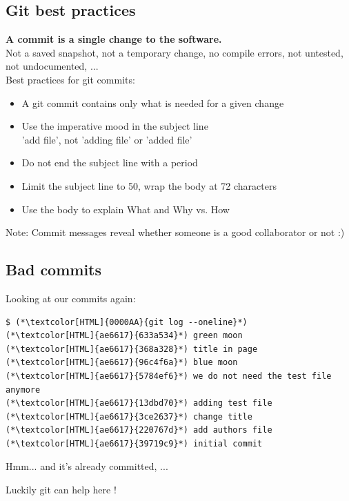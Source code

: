 \subsection{Git best practices}
\begin{frame}[fragile]
  \subslidetitle
  \textbf{A commit is a single change to the software.}\pause{} \\
  \vspace{1em}
  Not a saved snapshot,\pause{} not a temporary change,\pause{} no compile errors,\pause{} not
  untested,\pause{} not undocumented, ...\pause
  \\
  \vspace{1em}
  Best practices for git commits:
  \begin{itemize}
    \pause
    \item A git commit contains only what is needed for a given change
    \pause
    \item Use the imperative mood in the subject line \\
      'add file', not 'adding file' or 'added file'
    \pause
    \item Do not end the subject line with a period
    \pause
    \item Limit the subject line to 50, wrap the body at 72 characters
    \pause
    \item Use the body to explain What and Why vs. How
  \end{itemize}
  \pause
  \vspace{1em}
  Note: Commit messages reveal whether someone is a good collaborator or not :)
\end{frame}

\subsection{Bad commits}
\begin{frame}[fragile]
  \subslidetitle

  Looking at our commits again:
  \begin{lstlisting}
$ (*\textcolor[HTML]{0000AA}{git log --oneline}*)
(*\textcolor[HTML]{ae6617}{633a534}*) green moon
(*\textcolor[HTML]{ae6617}{368a328}*) title in page
(*\textcolor[HTML]{ae6617}{96c4f6a}*) blue moon
(*\textcolor[HTML]{ae6617}{5784ef6}*) we do not need the test file anymore
(*\textcolor[HTML]{ae6617}{13dbd70}*) adding test file
(*\textcolor[HTML]{ae6617}{3ce2637}*) change title
(*\textcolor[HTML]{ae6617}{220767d}*) add authors file
(*\textcolor[HTML]{ae6617}{39719c9}*) initial commit
\end{lstlisting}

  Hmm... and it's already committed, ...

  \vspace{1em}
  Luckily git can help here !
\end{frame}

